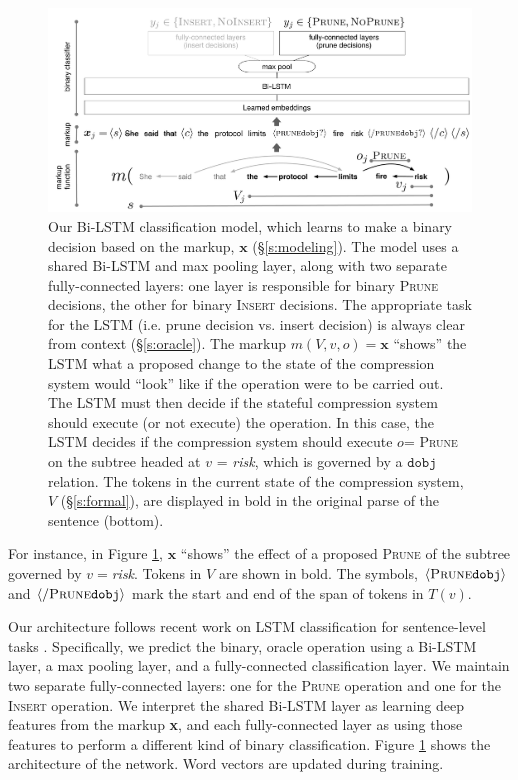 \documentclass[11pt,a4paper]{article}
\begin{document}
\begin{figure}[htb!]
\centering
\includegraphics[width=.75\textwidth]{example.pdf}
\caption{Our Bi-LSTM classification model, which learns to make a binary decision based on the markup, $\bm{x}$ (\S\ref{s:modeling}). The model uses a shared Bi-LSTM and max pooling layer, along with two separate fully-connected layers: one layer is responsible for binary \textsc{Prune} decisions, the other for binary \textsc{Insert} decisions. The appropriate task for the LSTM (i.e. prune decision vs. insert decision) is always clear from context (\S\ref{s:oracle}). The markup $m(V,v,o)=\bm{x}$ ``shows'' the LSTM what a proposed change to the state of the compression system would ``look'' like if the operation were to be carried out.  The LSTM must then decide if the stateful compression system should execute (or not execute) the operation. In this case, the LSTM decides if the compression system should execute $o$= \textsc{Prune} on the subtree headed at $v$ = \textit{risk}, which is governed by a $\texttt{dobj}$ relation. The tokens in the current state of the compression system, $V$ (\S\ref{s:formal}), are displayed in bold in the original parse of the sentence (bottom).}
\label{f:example}
\end{figure}

For instance, in Figure \ref{f:example}, $\bm{x}$ ``shows'' the  effect of a proposed \textsc{Prune} of the subtree governed by $v=$\textit{risk}. Tokens in $V$ are shown in bold. The symbols, $\langle \textsc{Prune} \texttt{dobj} \rangle$  and $\langle / \textsc{Prune} \texttt{dobj} \rangle$ mark the start and end of the span of tokens in $T(v)$.

Our architecture follows recent work on LSTM classification for sentence-level tasks \cite{D17-1070}. Specifically, we predict the binary, oracle operation using a Bi-LSTM layer, a max pooling layer, and a fully-connected classification layer. We maintain two separate fully-connected layers: one for the \textsc{Prune} operation and one for the \textsc{Insert} operation. We interpret the shared Bi-LSTM layer as learning deep features from the markup \textbf{x}, and each fully-connected layer as using those features to perform a different kind of binary classification. Figure \ref{f:example} shows the architecture of the network. Word vectors are updated during training.
\end{document}

